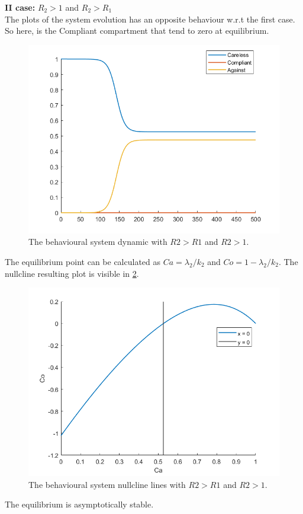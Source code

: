 \textbf{II case:} $R_2 >1$ and $R_2> R_1$\\
The plots of the system evolution has an opposite behaviour w.r.t the first case. So here, is the Compliant compartment that tend to zero at equilibrium. 

\begin{figure}[h]
	\centering
	\includegraphics[width=0.7\linewidth]{1_corpo/figure/behavioural_equilibrium/r2greater1_dyn}
	\caption[Behavioural dynamic second case]{The behavioural system dynamic with $R2 > R1$ and $R2 > 1$.}
	\label{fig:r2greater1dyn}
\end{figure}
The equilibrium point can be calculated as $Ca = \lambda_2/k_2$ and $Co = 1 - \lambda_2/k_2$. 
The nullcline resulting plot is visible in \ref{fig:r2greater1nullcline}. 
\begin{figure}[h]
	\centering
	\includegraphics[width=0.7\linewidth]{1_corpo/figure/behavioural_equilibrium/r2greater1_nullcline_1}
	\caption[Behavioural nullcline second case]{The behavioural system nullcline lines with $R2 > R1$ and $R2 > 1$.}
	\label{fig:r2greater1nullcline}
\end{figure}
The equilibrium is asymptotically stable. 

